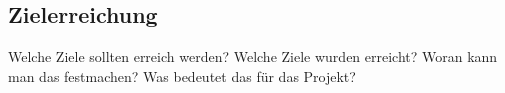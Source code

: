 \subsection{Zielerreichung}
\label{sec:Zielerreichung}

Welche Ziele sollten erreich werden?
Welche Ziele wurden erreicht?
Woran kann man das festmachen?
Was bedeutet das für das Projekt?
